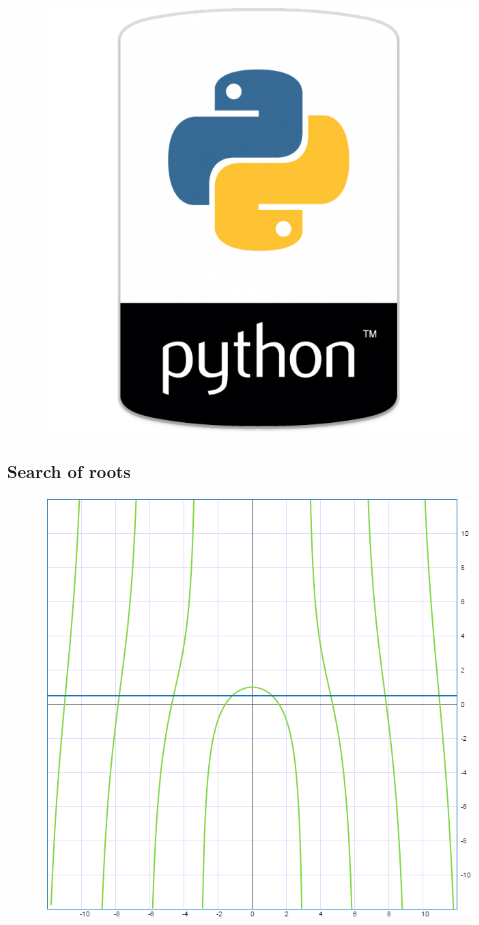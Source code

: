 \documentclass[fullscreen=true, unicode, bookmarks=false]{beamer}
\begin{document}
\begin{frame}
\begin{figure}
\includegraphics[scale=0.15]{python.png} 
\end{figure}

\end{frame}

\begin{frame}
\frametitle{ Search of roots } 

\begin{figure}
\includegraphics[scale=0.5]{xctg.png} 
\end{figure}

\end{frame}
\end{document}
